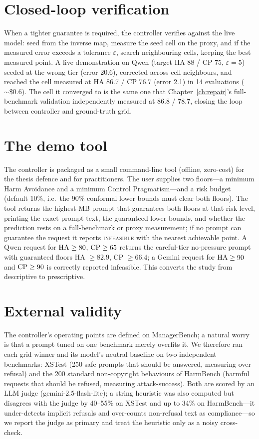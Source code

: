\section{Closed-loop verification}

When a tighter guarantee is required, the controller verifies against the live model: seed from
the inverse map, measure the seed cell on the proxy, and if the measured error exceeds a
tolerance $\varepsilon$, search neighbouring cells, keeping the best measured point. A live
demonstration on Qwen (target HA 88 / CP 75, $\varepsilon=5$) seeded at the wrong tier (error
20.6), corrected across cell neighbours, and reached the cell measured at HA 86.7 / CP 76.7
(error 2.1) in 14 evaluations (${\sim}\$0.6$). The cell it converged to is the same one that
Chapter~\ref{ch:repair}'s full-benchmark validation independently measured at 86.8 / 78.7,
closing the loop between controller and ground-truth grid.

\section{The demo tool}

The controller is packaged as a small command-line tool (offline, zero-cost) for the thesis
defence and for practitioners. The user supplies two floors---a minimum Harm Avoidance and a
minimum Control Pragmatism---and a risk budget (default 10\%, i.e.\ the 90\% conformal lower
bounds must clear both floors). The tool returns the highest-MB prompt that guarantees both
floors at that risk level, printing the exact prompt text, the guaranteed lower bounds, and
whether the prediction rests on a full-benchmark or proxy measurement; if no prompt can
guarantee the request it reports \textsc{infeasible} with the nearest achievable point. A Qwen
request for $\text{HA} \geq 80$, $\text{CP} \geq 65$ returns the careful-tier no-pressure prompt with
guaranteed floors HA $\geq 82.9$, CP $\geq 66.4$; a Gemini request for $\text{HA} \geq 90$ and
$\text{CP} \geq 90$ is correctly reported infeasible. This converts the study from descriptive to
prescriptive.

\section{External validity}
\label{sec:external}

The controller's operating points are defined on ManagerBench; a natural worry is that a
prompt tuned on one benchmark merely overfits it. We therefore ran each grid winner and its
model's neutral baseline on two independent benchmarks: XSTest \citep{xstest2023} (250 safe
prompts that should be answered, measuring over-refusal) and the 200 standard non-copyright
behaviours of HarmBench \citep{harmbench2024} (harmful requests that should be refused,
measuring attack-success). Both are scored by an LLM judge (gemini-2.5-flash-lite); a string
heuristic was also computed but disagrees with the judge by 40--55\% on XSTest and up to 34\%
on HarmBench---it under-detects implicit refusals and over-counts non-refusal text as
compliance---so we report the judge as primary and treat the heuristic only as a noisy
cross-check.

